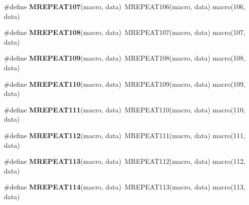 \begin{DoxyCompactItemize}
\item 
\hypertarget{group__group__xmega__utils__mrepeat_ga0cddcc3fa390ae9e30eaf07e9223be42}{\#define {\bfseries M\-R\-E\-P\-E\-A\-T107}(macro, data)~M\-R\-E\-P\-E\-A\-T106(macro, data)   macro(106, data)}\label{group__group__xmega__utils__mrepeat_ga0cddcc3fa390ae9e30eaf07e9223be42}

\item 
\hypertarget{group__group__xmega__utils__mrepeat_gacfbea84aacb4958d50fc747c7f512dcb}{\#define {\bfseries M\-R\-E\-P\-E\-A\-T108}(macro, data)~M\-R\-E\-P\-E\-A\-T107(macro, data)   macro(107, data)}\label{group__group__xmega__utils__mrepeat_gacfbea84aacb4958d50fc747c7f512dcb}

\item 
\hypertarget{group__group__xmega__utils__mrepeat_ga3756d19974e9584f0e8f0c6e404c8f61}{\#define {\bfseries M\-R\-E\-P\-E\-A\-T109}(macro, data)~M\-R\-E\-P\-E\-A\-T108(macro, data)   macro(108, data)}\label{group__group__xmega__utils__mrepeat_ga3756d19974e9584f0e8f0c6e404c8f61}

\item 
\hypertarget{group__group__xmega__utils__mrepeat_ga7ada858a2020e79d348db928bc0b886b}{\#define {\bfseries M\-R\-E\-P\-E\-A\-T110}(macro, data)~M\-R\-E\-P\-E\-A\-T109(macro, data)   macro(109, data)}\label{group__group__xmega__utils__mrepeat_ga7ada858a2020e79d348db928bc0b886b}

\item 
\hypertarget{group__group__xmega__utils__mrepeat_gaa95d8fb6f36efe2095bac8dee72ffb69}{\#define {\bfseries M\-R\-E\-P\-E\-A\-T111}(macro, data)~M\-R\-E\-P\-E\-A\-T110(macro, data)   macro(110, data)}\label{group__group__xmega__utils__mrepeat_gaa95d8fb6f36efe2095bac8dee72ffb69}

\item 
\hypertarget{group__group__xmega__utils__mrepeat_ga9e7619019279e0bb7b52e9825bac227d}{\#define {\bfseries M\-R\-E\-P\-E\-A\-T112}(macro, data)~M\-R\-E\-P\-E\-A\-T111(macro, data)   macro(111, data)}\label{group__group__xmega__utils__mrepeat_ga9e7619019279e0bb7b52e9825bac227d}

\item 
\hypertarget{group__group__xmega__utils__mrepeat_ga41f4b4f9d9ce5b392cfa10804e69b163}{\#define {\bfseries M\-R\-E\-P\-E\-A\-T113}(macro, data)~M\-R\-E\-P\-E\-A\-T112(macro, data)   macro(112, data)}\label{group__group__xmega__utils__mrepeat_ga41f4b4f9d9ce5b392cfa10804e69b163}

\item 
\hypertarget{group__group__xmega__utils__mrepeat_gab7df5ef1e6f0f3980e9e94b701ecd4dd}{\#define {\bfseries M\-R\-E\-P\-E\-A\-T114}(macro, data)~M\-R\-E\-P\-E\-A\-T113(macro, data)   macro(113, data)}\label{group__group__xmega__utils__mrepeat_gab7df5ef1e6f0f3980e9e94b701ecd4dd}


\end{DoxyCompactItemize}
